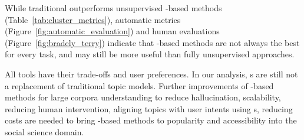 While traditional \lda{} outperforms unsupervised \mm{}-based methods (Table~\ref{tab:cluster_metrics}), automatic metrics (Figure~\ref{fig:automatic_evaluation}) and human evaluations (Figure~\ref{fig:bradely_terry}) indicate that \mm{}-based methods are not always the best for every task, and  may still be more useful than fully unsupervised \mm{} approaches.

All tools have their trade-offs and user preferences.
%
In our analysis, \mm{}s are still not a replacement of traditional
topic models.
%
Further improvements of \mm{}-based methods for large corpora understanding to reduce
hallucination, scalability, reducing human intervention, aligning
topics with user intents using \mm{}s, reducing costs are needed to
bring \mm{}-based methods to popularity and accessibility into the social science
domain.










%











